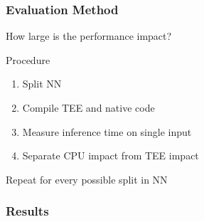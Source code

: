 \documentclass[aspectratio=169,nototalframenumber]{beamer}
\begin{document}
\begin{frame}
    \frametitle{Evaluation Method}
	How large is the performance impact?\par
	\begin{block}{Procedure}
	\begin{enumerate}
		\item Split NN
		\item Compile TEE and native code
		\item Measure inference time on single input
		\item Separate CPU impact from TEE impact
	\end{enumerate}
	\end{block}

	\vspace{1cm}
	Repeat for every possible split in NN
\end{frame}

\begin{frame}
    \frametitle{Results}

\end{frame}
\end{document}
